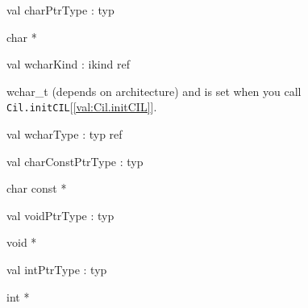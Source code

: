 \documentclass[11pt]{article}
\begin{document}
\label{val:Cil.charPtrType}\begin{ocamldoccode}
val charPtrType : typ
\end{ocamldoccode}
\begin{ocamldocdescription}
char *


\end{ocamldocdescription}




\label{val:Cil.wcharKind}\begin{ocamldoccode}
val wcharKind : ikind ref
\end{ocamldoccode}
\begin{ocamldocdescription}
wchar\_t (depends on architecture) and is set when you call 
 {\tt{Cil.initCIL}}[\ref{val:Cil.initCIL}].


\end{ocamldocdescription}




\label{val:Cil.wcharType}\begin{ocamldoccode}
val wcharType : typ ref
\end{ocamldoccode}




\label{val:Cil.charConstPtrType}\begin{ocamldoccode}
val charConstPtrType : typ
\end{ocamldoccode}
\begin{ocamldocdescription}
char const *


\end{ocamldocdescription}




\label{val:Cil.voidPtrType}\begin{ocamldoccode}
val voidPtrType : typ
\end{ocamldoccode}
\begin{ocamldocdescription}
void *


\end{ocamldocdescription}




\label{val:Cil.intPtrType}\begin{ocamldoccode}
val intPtrType : typ
\end{ocamldoccode}
\begin{ocamldocdescription}
int *


\end{ocamldocdescription}
\end{document}
